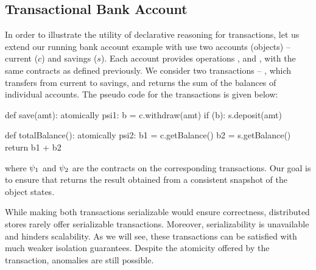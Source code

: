 \subsection{Transactional Bank Account}

In order to illustrate the utility of declarative reasoning for transactions,
let us extend our running bank account example with use two accounts (objects)
-- current ($c$) and savings ($s$). Each account provides operations
,  and , with the same contracts as
defined previously. We consider two transactions -- , which
transfers  from current to savings, and  returns
the sum of the balances of individual accounts. The pseudo code for the
transactions is given below:

\noindent \begin{minipage}[t]{0.5\columnwidth}
\begin{codepython}
def save(amt):
  atomically psi1:
    b = c.withdraw(amt)
    if (b): s.deposit(amt)
\end{codepython}
\end{minipage}
\begin{minipage}[t]{0.5\columnwidth}
\begin{codepython}
def totalBalance():
  atomically psi2:
    b1 = c.getBalance()
    b2 = s.getBalance()
    return b1 + b2
\end{codepython}
\end{minipage}

\noindent where $\psi_1$ and $\psi_2$ are the contracts on the corresponding
transactions. Our goal is to ensure that  returns the result
obtained from a consistent snapshot of the object states.

While making both transactions serializable would ensure correctness,
distributed stores rarely offer serializable transactions. Moreover,
serializability is unavailable and hinders scalability. As we will see, these
transactions can be satisfied with much weaker isolation guarantees. Despite
the atomicity offered by the transaction, anomalies are still possible.
